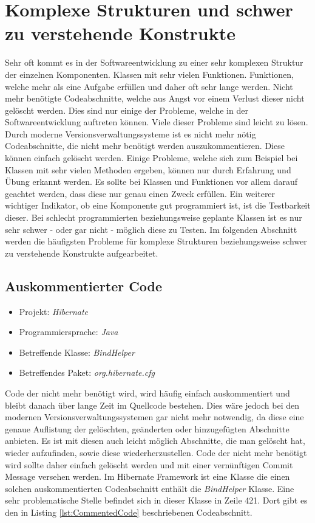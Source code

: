 \section{Komplexe Strukturen und schwer zu verstehende Konstrukte}

\SuperPar Sehr oft kommt es in der Softwareentwicklung zu einer sehr komplexen Struktur der einzelnen Komponenten. Klassen mit sehr vielen Funktionen. Funktionen, welche mehr als eine Aufgabe erfüllen und daher oft sehr lange werden. Nicht mehr benötigte Codeabschnitte, welche aus Angst vor einem Verlust dieser nicht gelöscht werden. Dies sind nur einige der Probleme, welche in der Softwareentwicklung auftreten können. Viele dieser Probleme sind leicht zu lösen. Durch moderne Versionsverwaltungssysteme ist es nicht mehr nötig Codeabschnitte, die nicht mehr benötigt werden auszukommentieren. Diese können einfach gelöscht werden. Einige Probleme, welche sich zum Beispiel bei Klassen mit sehr vielen Methoden ergeben, können nur durch Erfahrung und Übung erkannt werden. Es sollte bei Klassen und Funktionen vor allem darauf geachtet werden, dass diese nur genau einen Zweck erfüllen. Ein weiterer wichtiger Indikator, ob eine Komponente gut programmiert ist, ist die Testbarkeit dieser. Bei schlecht programmierten beziehungsweise geplante Klassen ist es nur sehr schwer - oder gar nicht - möglich diese zu Testen. Im folgenden Abschnitt werden die häufigsten Probleme für komplexe Strukturen beziehungsweise schwer zu verstehende Konstrukte aufgearbeitet.

\subsection{Auskommentierter Code}
\begin{itemize}
	\item Projekt: \textit{Hibernate}
	\item Programmiersprache: \textit{Java}
	\item Betreffende Klasse: \textit{BindHelper}
	\item Betreffendes Paket: \textit{org.hibernate.cfg}
\end{itemize}


\SuperPar Code der nicht mehr benötigt wird, wird häufig einfach auskommentiert und bleibt danach über lange Zeit im Quellcode bestehen. Dies wäre jedoch bei den modernen Versionsverwaltungssystemen gar nicht mehr notwendig, da diese eine genaue Auflistung der gelöschten, geänderten oder hinzugefügten Abschnitte anbieten. Es ist mit diesen auch leicht möglich Abschnitte, die man gelöscht hat, wieder aufzufinden, sowie diese wiederherzustellen. Code der nicht mehr benötigt wird sollte daher einfach gelöscht werden und mit einer vernünftigen Commit Message versehen werden. Im Hibernate Framework ist eine Klasse die einen solchen auskommentierten Codeabschnitt enthält die \textit{BindHelper} Klasse. Eine sehr problematische Stelle befindet sich in dieser Klasse in Zeile 421. Dort gibt es den in Listing \ref{lst:CommentedCode} beschriebenen Codeabschnitt.

